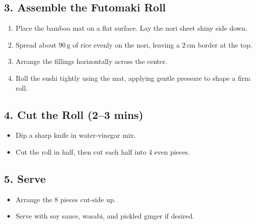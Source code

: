 \documentclass[landscape, a4paper]{article}
\begin{document}
\begin{minipage}[t]{0.31\textwidth}
	\subsection*{3. Assemble the Futomaki Roll}
	\begin{enumerate}
		\item Place the bamboo mat on a flat surface. Lay the nori sheet shiny side down.
		\item Spread about \(90\,\mathrm{g}\) of rice evenly on the nori, leaving a \(2\,\mathrm{cm}\) border at the top.
		\item Arrange the fillings horizontally across the center.
		\item Roll the sushi tightly using the mat, applying gentle pressure to shape a firm roll.
	\end{enumerate}

	\subsection*{4. Cut the Roll (2–3 mins)}
	\begin{itemize}
		\item Dip a sharp knife in water-vinegar mix.
		\item Cut the roll in half, then cut each half into 4 even pieces.
	\end{itemize}

	\subsection*{5. Serve}
	\begin{itemize}
		\item Arrange the 8 pieces cut-side up.
		\item Serve with soy sauce, wasabi, and pickled ginger if desired.
	\end{itemize}

\end{minipage}%
\hfill%
\vrule width 0.01cm
\hfill%
\end{document}
